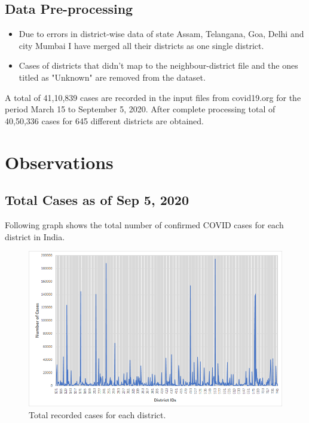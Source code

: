 \documentclass{article}
\begin{document}
\subsection{Data Pre-processing}
\begin{itemize}
    \item Due to errors in district-wise data of state Assam, Telangana, Goa, Delhi and city Mumbai I have merged all their districts as one single district.
    \item Cases of districts that didn't map to the neighbour-district file and the ones titled as "Unknown" are removed from the dataset.
  
\end{itemize}

A total of 41,10,839 cases are recorded in the input files from covid19.org for the period March 15 to September 5, 2020. After complete processing total of 40,50,336 cases for 645 different districts are obtained. 




\pagebreak
\section{Observations} %

\subsection{Total Cases as of Sep 5, 2020}
Following graph shows the total number of confirmed COVID cases for each district in India.\\
\begin{figure}[h]
    \centering
    \includegraphics[scale = 0.76]{images/cases-districtid.png}
    \caption{Total recorded cases for each district.}
\end{figure}
\end{document}
